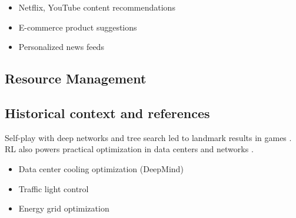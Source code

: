 \begin{itemize}
    \item Netflix, YouTube content recommendations
    \item E-commerce product suggestions
    \item Personalized news feeds
\end{itemize}

\subsection{Resource Management}



\subsection{Historical context and references}

Self-play with deep networks and tree search led to landmark results in games \textcite{Silver2016}. RL also powers practical optimization in data centers and networks \textcite{Prince2023}.
\begin{itemize}
    \item Data center cooling optimization (DeepMind)
    \item Traffic light control
    \item Energy grid optimization
\end{itemize}

